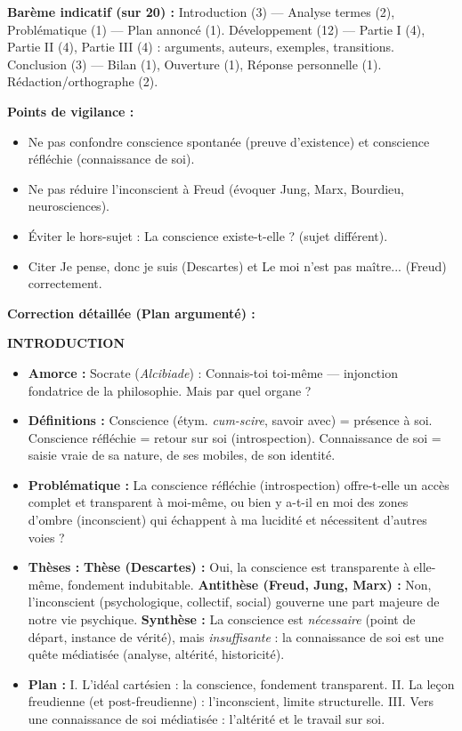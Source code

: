 \documentclass[11pt]{article}
\newcommand{\cle}[1]{{\popxbold\color{popdark}#1}}
\newcounter{popsec}
\newcounter{popsub}
\newcommand{\courssub}[1]{%
  \stepcounter{popsub}%
  \par\vspace{9pt}\noindent{\popxbold\fontsize{11.5}{13}\selectfont\color{popink}{\color{poporange}\thepopsec.\thepopsub}\hspace{6pt}#1}\par\nopagebreak\vspace{4pt}
}
\begin{document}
\courssub{Je me prépare au Bac}

\begin{corrige}
\textbf{Barème indicatif (sur 20) :} Introduction (3) — Analyse termes (2), Problématique (1) — Plan annoncé (1). Développement (12) — Partie I (4), Partie II (4), Partie III (4) : arguments, auteurs, exemples, transitions. Conclusion (3) — Bilan (1), Ouverture (1), Réponse personnelle (1). Rédaction/orthographe (2).

\textbf{Points de vigilance :}
\begin{itemize}
\item Ne pas confondre \cle{conscience spontanée} (preuve d'existence) et \cle{conscience réfléchie} (connaissance de soi).
\item Ne pas réduire l'inconscient à Freud (évoquer Jung, Marx, Bourdieu, neurosciences).
\item Éviter le hors-sujet : \guillemotleft La conscience existe-t-elle ? \guillemotright (sujet différent).
\item Citer \guillemotleft Je pense, donc je suis \guillemotright (Descartes) et \guillemotleft Le moi n'est pas maître... \guillemotright (Freud) correctement.
\end{itemize}

\textbf{Correction détaillée (Plan argumenté) :}

\textbf{INTRODUCTION}
\begin{itemize}
\item \textbf{Amorce :} Socrate (\emph{Alcibiade}) : \guillemotleft Connais-toi toi-même \guillemotright — injonction fondatrice de la philosophie. Mais par quel organe ?
\item \textbf{Définitions :} \cle{Conscience} (étym. \emph{cum-scire}, savoir avec) = présence à soi. \cle{Conscience réfléchie} = retour sur soi (introspection). \cle{Connaissance de soi} = saisie vraie de sa nature, de ses mobiles, de son identité.
\item \textbf{Problématique :} La conscience réfléchie (introspection) offre-t-elle un accès complet et transparent à moi-même, ou bien y a-t-il en moi des zones d'ombre (inconscient) qui échappent à ma lucidité et nécessitent d'autres voies ?
\item \textbf{Thèses :} \textbf{Thèse (Descartes) :} Oui, la conscience est transparente à elle-même, fondement indubitable. \textbf{Antithèse (Freud, Jung, Marx) :} Non, l'inconscient (psychologique, collectif, social) gouverne une part majeure de notre vie psychique. \textbf{Synthèse :} La conscience est \emph{nécessaire} (point de départ, instance de vérité), mais \emph{insuffisante} : la connaissance de soi est une \cle{quête médiatisée} (analyse, altérité, historicité).
\item \textbf{Plan :} I. L'idéal cartésien : la conscience, fondement transparent. II. La leçon freudienne (et post-freudienne) : l'inconscient, limite structurelle. III. Vers une connaissance de soi médiatisée : l'altérité et le travail sur soi.
\end{itemize}


\end{corrige}
\end{document}
